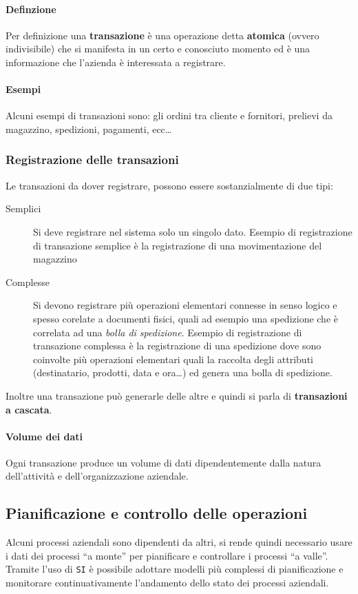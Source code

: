             \paragraph{Definzione} Per definizione una \textbf{transazione} è una operazione detta \textbf{atomica} (ovvero indivisibile) che si manifesta in un certo e conosciuto momento ed è una informazione che l'azienda è interessata a registrare.
            \paragraph{Esempi} Alcuni esempi di transazioni sono: gli ordini tra cliente e fornitori, prelievi da magazzino, spedizioni, pagamenti, ecc\dots
        \subsubsection{Registrazione delle transazioni}
            Le transazioni da dover registrare, possono essere sostanzialmente di due tipi:
            \begin{description}
                \item[Semplici] Si deve registrare nel sistema solo un singolo dato.
                    \subitem Esempio di registrazione di transazione semplice è la registrazione di una movimentazione del magazzino
                \item[Complesse] Si devono registrare più operazioni elementari connesse in senso logico e spesso corelate a documenti fisici, quali ad esempio una spedizione che è correlata ad una \textit{bolla di spedizione}.
                    \subitem Esempio di registrazione di transazione complessa è la registrazione di una spedizione dove sono coinvolte più operazioni elementari quali la raccolta degli attributi (destinatario, prodotti, data e ora\dots) ed genera una bolla di spedizione.
            \end{description}
            Inoltre una transazione può generarle delle altre e quindi si parla di \textbf{transazioni a cascata}.
            \paragraph{Volume dei dati} Ogni transazione produce un volume di dati dipendentemente dalla natura dell'attività e dell'organizzazione aziendale.
    \subsection{Pianificazione e controllo delle operazioni}
        Alcuni processi aziendali sono dipendenti da altri, si rende quindi necessario usare i dati dei processi ``a monte'' per pianificare e controllare i processi ``a valle''. Tramite l'uso di \texttt{SI} è possibile adottare modelli più complessi di pianificazione e monitorare continuativamente l'andamento dello stato dei processi aziendali. 

